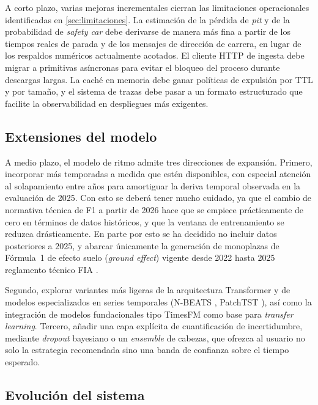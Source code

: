 A corto plazo, varias mejoras incrementales cierran las limitaciones operacionales identificadas en \ref{sec:limitaciones}. La estimación de la pérdida de \textit{pit} y de la probabilidad de \textit{safety car} debe derivarse de manera más fina a partir de los tiempos reales de parada y de los mensajes de dirección de carrera, en lugar de los respaldos numéricos actualmente acotados. El cliente HTTP de ingesta debe migrar a primitivas asíncronas para evitar el bloqueo del proceso durante descargas largas. La caché en memoria debe ganar políticas de expulsión por TTL y por tamaño, y el sistema de trazas debe pasar a un formato estructurado que facilite la observabilidad en despliegues más exigentes.

\subsection{Extensiones del modelo}
\label{ssec:extensiones_modelo}

A medio plazo, el modelo de ritmo admite tres direcciones de expansión. Primero, incorporar más temporadas a medida que estén disponibles, con especial atención al solapamiento entre años para amortiguar la deriva temporal observada en la evaluación de 2025. Con esto se deberá tener mucho cuidado, ya que el cambio de normativa técnica de F1 a partir de 2026 \cite{fia2026technical} hace que se empiece prácticamente de cero en términos de datos históricos, y que la ventana de entrenamiento se reduzca drásticamente. En parte por esto se ha decidido no incluir datos posteriores a 2025, y abarcar únicamente la generación de monoplazas de Fórmula~1 de efecto suelo (\textit{ground effect}) vigente desde 2022 hasta 2025 reglamento técnico FIA \cite{fia2026technical}.

Segundo, explorar variantes más ligeras de la arquitectura Transformer y de modelos especializados en series temporales (N-BEATS \cite{oreshkin2020nbeats}, PatchTST \cite{nie2023patchtst}), así como la integración de modelos fundacionales tipo TimesFM \cite{das2024timesfm} como base para \textit{transfer learning}. Tercero, añadir una capa explícita de cuantificación de incertidumbre, mediante \textit{dropout} bayesiano \cite{gal2016dropout} o un \textit{ensemble} de cabezas, que ofrezca al usuario no solo la estrategia recomendada sino una banda de confianza sobre el tiempo esperado.

\subsection{Evolución del sistema}
\label{ssec:evolucion_sistema}

